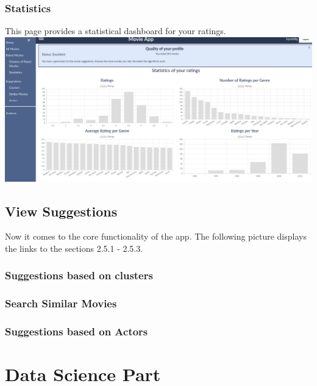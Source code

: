 \documentclass{article}
\begin{document}
\subsubsection{Statistics}

This page provides a statistical dashboard for your ratings.\\[2ex]
\includegraphics[scale=0.2]{screenshots_app/rated_movies_statistics.png}\\





\subsection{View Suggestions}

Now it comes to the core functionality of the app. The following picture displays the links to the sections 2.5.1 - 2.5.3.

\subsubsection{Suggestions based on clusters}



\subsubsection{Search Similar Movies}



\subsubsection{Suggestions based on Actors}





\section{Data Science Part}
\end{document}
